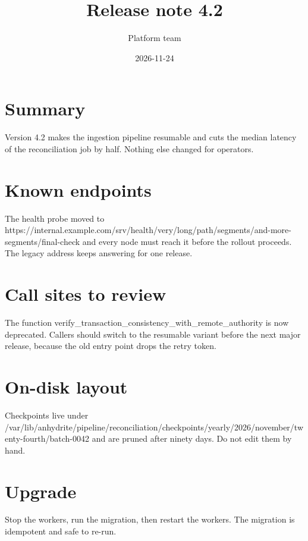 \documentclass[11pt]{article}
\title{Release note 4.2}
\author{Platform team}
\date{2026-11-24}
\begin{document}
\maketitle

\section{Summary}
Version 4.2 makes the ingestion pipeline resumable and cuts the median
latency of the reconciliation job by half. Nothing else changed for
operators.

\section{Known endpoints}
The health probe moved to https://internal.example.com/srv/health/very/long/path/segments/and-more-segments/final-check and every node must reach it before the rollout proceeds. The legacy address keeps answering for one release.

\section{Call sites to review}
The function verify\_transaction\_consistency\_with\_remote\_authority is now
deprecated. Callers should switch to the resumable variant before the next
major release, because the old entry point drops the retry token.

\section{On-disk layout}
Checkpoints live under /var/lib/anhydrite/pipeline/reconciliation/checkpoints/yearly/2026/november/twenty-fourth/batch-0042 and are pruned after ninety days. Do not edit them by hand.

\section{Upgrade}
Stop the workers, run the migration, then restart the workers. The
migration is idempotent and safe to re-run.
\end{document}
